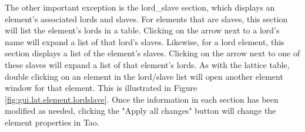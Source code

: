 The other important exception is the lord_slave section, which displays an element's associated lords and slaves.
For elements that are slaves, this section will list the element's lords in a table.
Clicking on the arrow next to a lord's name will expand a list of that lord's slaves.
Likewise, for a lord element, this section displays a list of the element's slaves.
Clicking on the arrow next to one of these slaves will expand a list of that element's lords.
As with the lattice table, double clicking on an element in the lord/slave list will open another element window for that element.
This is illustrated in Figure \ref{fig:gui.lat.element.lordslave}.
Once the information in each section has been modified as needed, clicking the "Apply all changes" button will change the element properties in Tao.
